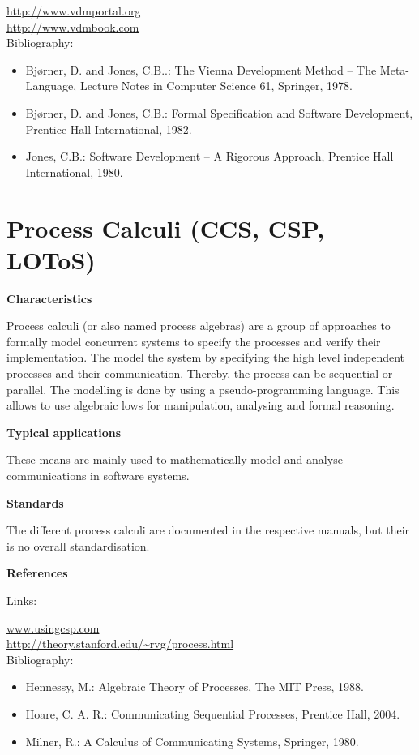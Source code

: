\documentclass{./template/openetcs_report}
\begin{document}
\url{http://www.vdmportal.org} \\[4pt]
\url{http://www.vdmbook.com} \\[4pt]

Bibliography:

\begin{itemize}
\item Bj\o{}rner, D. and Jones, C.B..: The Vienna Development Method -- The Meta-Language, Lecture Notes in Computer Science 61, Springer, 1978. 
\item Bj\o{}rner, D. and Jones, C.B.: Formal Specification and Software Development, Prentice Hall International, 1982.
\item Jones, C.B.: Software Development -- A Rigorous Approach, Prentice Hall International, 1980.
\end{itemize}

\section{Process Calculi (CCS, CSP, LOToS) }

	\textbf{Characteristics}

Process calculi (or also named process algebras) are a group of approaches to formally model concurrent systems to specify the processes and verify their implementation. The model the system by specifying the high level independent processes and their communication. Thereby, the process can be sequential or parallel. The modelling is done by using a pseudo-programming language. This allows to use algebraic lows for manipulation, analysing and formal reasoning.

	\textbf{Typical applications}

These means are mainly used to mathematically model and analyse communications in software systems.

	\textbf{Standards}

The different process calculi are documented in the respective manuals, but their is no overall standardisation.

	\textbf{References}

Links:

\url{www.usingcsp.com} \\[4pt]
\url{http://theory.stanford.edu/~rvg/process.html} \\[4pt]

Bibliography:

\begin{itemize}
\item Hennessy, M.: Algebraic Theory of Processes, The MIT Press, 1988.
\item Hoare, C. A. R.: Communicating Sequential Processes, Prentice Hall, 2004.
\item Milner, R.: A Calculus of Communicating Systems, Springer, 1980.
\end{itemize}
\end{document}
